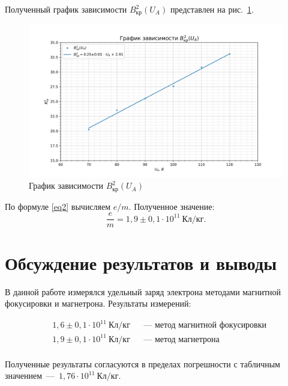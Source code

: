\documentclass[a4paper, 12pt]{article}
\begin{document}
Полученный график зависимости $B^2_{кр}(U_A)$ представлен на рис.~\ref{ris6}.

\vspace{10cm}

\begin{figure}[h!]
\begin{flushleft}
    \includegraphics[scale=0.7]{3.3.1_4.png}
\end{flushleft}
\caption{График зависимости $B^2_{кр}(U_A)$}
\label{ris6}
\end{figure}

По формуле \eqref{eq2} вычисляем $e/m$. Полученное значение: $$\frac{e}{m} = 1,9\pm0,1\cdot 10^{11}~Кл/кг.$$

\section{Обсуждение результатов и выводы}

В данной работе измерялся удельный заряд электрона методами магнитной фокусировки и магнетрона. Результаты измерений:

$$\boxed{\begin{aligned}
&1,6\pm0,1\cdot 10^{11}~Кл/кг && \text{--- метод магнитной фокусировки} \\
&1,9\pm0,1\cdot 10^{11}~Кл/кг && \text{--- метод магнетрона} \\
\end{aligned}}$$

Полученные результаты согласуются в пределах погрешности с табличным значением~---~$1,76 \cdot 10^{11}~Кл/кг$.
\end{document}
